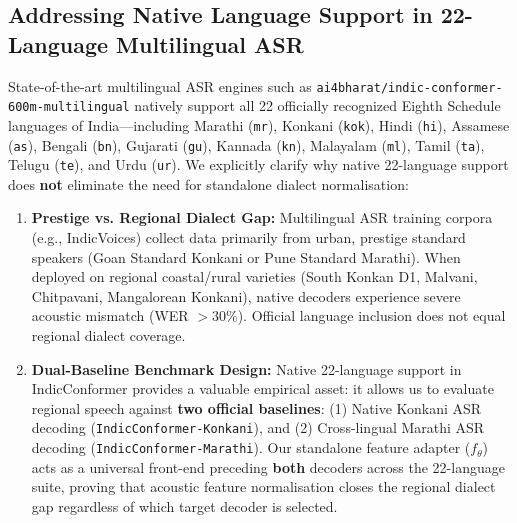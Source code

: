 \documentclass[11pt]{article}
\begin{document}
\subsection{Addressing Native Language Support in 22-Language Multilingual ASR}
State-of-the-art multilingual ASR engines such as \texttt{ai4bharat/indic-conformer-600m-multilingual} natively support all 22 officially recognized Eighth Schedule languages of India—including Marathi (\texttt{mr}), Konkani (\texttt{kok}), Hindi (\texttt{hi}), Assamese (\texttt{as}), Bengali (\texttt{bn}), Gujarati (\texttt{gu}), Kannada (\texttt{kn}), Malayalam (\texttt{ml}), Tamil (\texttt{ta}), Telugu (\texttt{te}), and Urdu (\texttt{ur}). We explicitly clarify why native 22-language support does \textbf{not} eliminate the need for standalone dialect normalisation:

\begin{enumerate}[leftmargin=*]
  \item \textbf{Prestige vs. Regional Dialect Gap:}
    Multilingual ASR training corpora (e.g., IndicVoices) collect data primarily from urban, prestige standard speakers (Goan Standard Konkani or Pune Standard Marathi). When deployed on regional coastal/rural varieties (South Konkan D1, Malvani, Chitpavani, Mangalorean Konkani), native decoders experience severe acoustic mismatch (WER $>30\%$). Official language inclusion does not equal regional dialect coverage.
  \item \textbf{Dual-Baseline Benchmark Design:}
    Native 22-language support in IndicConformer provides a valuable empirical asset: it allows us to evaluate regional speech against \textbf{two official baselines}: (1) Native Konkani ASR decoding (\texttt{IndicConformer-Konkani}), and (2) Cross-lingual Marathi ASR decoding (\texttt{IndicConformer-Marathi}). Our standalone feature adapter ($f_\theta$) acts as a universal front-end preceding \textbf{both} decoders across the 22-language suite, proving that acoustic feature normalisation closes the regional dialect gap regardless of which target decoder is selected.
\end{enumerate}
\end{document}
